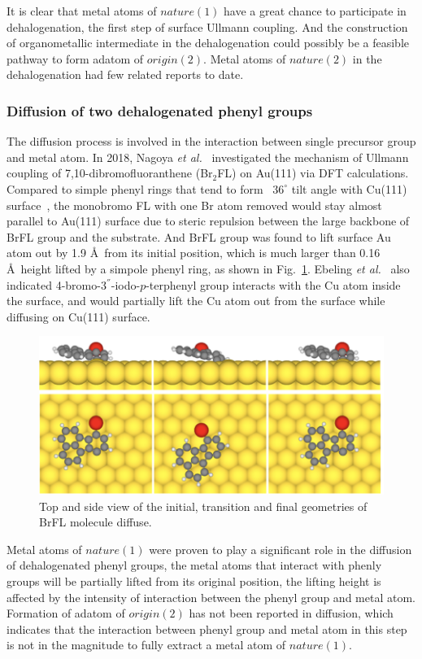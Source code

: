 \documentclass[%
 reprint,
 amsmath,amssymb,
 aps,
prb,
]{revtex4-1}
\begin{document}
It is clear that metal atoms of $nature(1)$ have a great chance to participate in dehalogenation, the first step of surface Ullmann coupling. And the construction of organometallic intermediate in the dehalogenation could possibly be a feasible pathway to form adatom of $origin(2)$. Metal atoms of $nature(2)$ in the dehalogenation had few related reports to date.

\subsubsection{Diffusion of two dehalogenated phenyl groups}

The diffusion process is involved in the interaction between single precursor group and metal atom. 
In 2018, Nagoya \textit{et al.}~\cite{jpcc2018} investigated the mechanism of Ullmann coupling of 7,10-dibromofluoranthene (Br$_{2}$FL) on Au(111) via DFT calculations. Compared to simple phenyl rings that tend to form ~$36^\circ$ tilt angle with Cu(111) surface~\cite{pccp2010}, the monobromo FL with one Br atom removed would stay almost parallel to Au(111) surface due to steric repulsion between the large backbone of BrFL group and the substrate. And BrFL group was found to lift surface Au atom out by 1.9 \AA\ from its initial position, which is much larger than 0.16 \AA\ height lifted by a simpole phenyl ring, as shown in Fig.~\ref{fig:diff}.
Ebeling \textit{et al.}~\cite{acsnano2019} also indicated 4-bromo-3$^{''}$-iodo-$p$-terphenyl group interacts with the Cu atom inside the surface, and would partially lift the Cu atom out from the surface while diffusing on Cu(111) surface. 
\begin{figure}[hbt]
\centering
\includegraphics[width=0.75\columnwidth]{Fig/Diffusion_path.png}
\caption{Top and side view of the initial, transition and final geometries of BrFL molecule diffuse.}
\label{fig:diff}
\end{figure}

Metal atoms of $nature(1)$ were proven to play a significant role in the diffusion of dehalogenated phenyl groups, the metal atoms that interact with phenly groups will be partially lifted from its original position, the lifting height is affected by the intensity of interaction between the phenyl group and metal atom. Formation of adatom of $origin(2)$ has not been reported in diffusion, which indicates that the interaction between phenyl group and metal atom in this step is not in the magnitude to fully extract a metal atom of $nature(1)$. 
\end{document}
